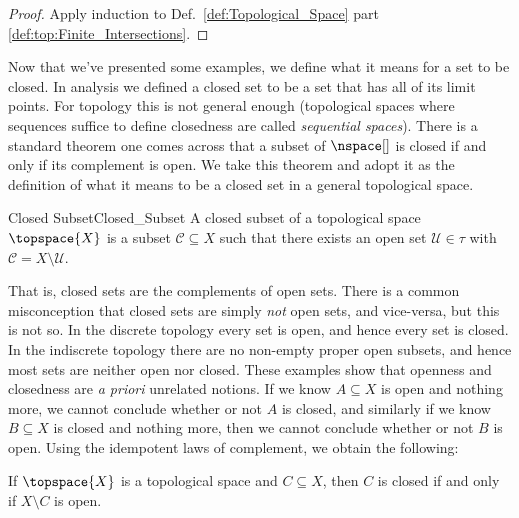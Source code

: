 \documentclass[oneside]{book}                                                  %
\begin{document}
                \begin{proof}
                    Apply induction to Def.~\ref{def:Topological_Space}
                    part \ref{def:top:Finite_Intersections}.
                \end{proof}
                Now that we've presented some examples, we define what it means
                for a set to be closed. In analysis we defined a closed set to
                be a set that has all of its limit points. For topology this is
                not general enough (topological spaces where sequences suffice
                to define closedness are called \textit{sequential spaces}).
                There is a standard theorem one comes across that a subset of
                $\nspace[]$ is closed if and only if its complement is open. We
                take this theorem and adopt it as the definition of what it
                means to be a closed set in a general topological space.
                \begin{fdefinition}{Closed Subset}{Closed_Subset}
                    A closed subset of a topological space $\topspace{X}$ is a
                    subset $\mathcal{C}\subseteq{X}$ such that there exists an
                    open set $\mathcal{U}\in\tau$ with
                    $\mathcal{C}=X\setminus\mathcal{U}$.
                \end{fdefinition}
                That is, closed sets are the complements of open sets. There is
                a common misconception that closed sets are simply \textit{not}
                open sets, and vice-versa, but this is not so. In the discrete
                topology every set is open, and hence every set is closed. In
                the indiscrete topology there are no non-empty proper open
                subsets, and hence most sets are neither open nor closed. These
                examples show that openness and closedness are
                \textit{a priori} unrelated notions. If we know $A\subseteq{X}$
                is open and nothing more, we cannot conclude whether or not $A$
                is closed, and similarly if we know $B\subseteq{X}$ is closed
                and nothing more, then we cannot conclude whether or not $B$ is
                open. Using the idempotent laws of complement, we obtain the
                following:
                \begin{theorem}
                    \label{thm:Closed_Iff_Comp_is_Open}%
                    If $\topspace{X}$ is a topological space and
                    $C\subseteq{X}$, then $C$ is closed if and only if
                    $X\setminus{C}$ is open.
                \end{theorem}
\end{document}
